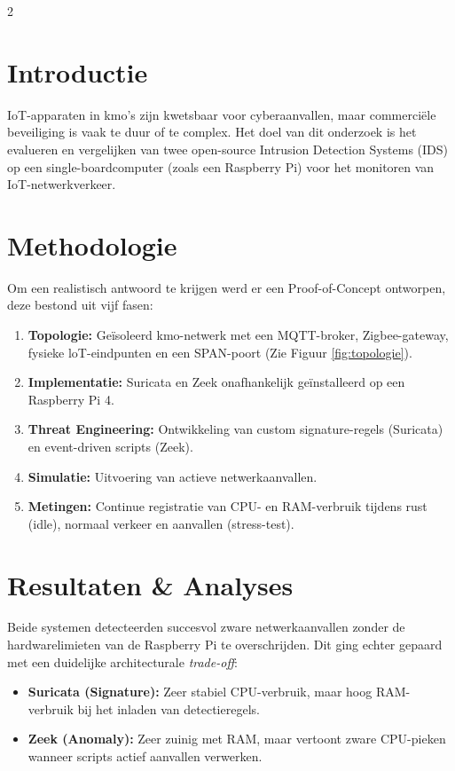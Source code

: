 \documentclass[a0,portrait]{hogent-poster}
\begin{document}
\begin{multicols}{2} %
\raggedbottom
\section{Introductie}
IoT-apparaten in kmo's zijn kwetsbaar voor cyberaanvallen, maar commerciële beveiliging is vaak te duur of te complex. Het doel van dit onderzoek is het evalueren en vergelijken van twee open-source Intrusion Detection Systems (IDS) op een single-boardcomputer (zoals een Raspberry Pi) voor het monitoren van IoT-netwerkverkeer.
\section{Methodologie}
Om een realistisch antwoord te krijgen werd er een Proof-of-Concept ontworpen, deze bestond uit vijf fasen:

\begin{enumerate}
    \setlength\itemsep{20pt}
    \item \textbf{Topologie:} Geïsoleerd kmo-netwerk met een MQTT-broker, Zigbee-gateway, fysieke loT-eindpunten en een SPAN-poort (Zie Figuur \ref{fig:topologie}).
    \item \textbf{Implementatie:} Suricata en Zeek onafhankelijk geïnstalleerd op een Raspberry Pi 4.
    \item \textbf{Threat Engineering:} Ontwikkeling van custom signature-regels (Suricata) en event-driven scripts (Zeek).
    \item \textbf{Simulatie:} Uitvoering van actieve netwerkaanvallen.
    \item \textbf{Metingen:} Continue registratie van CPU- en RAM-verbruik tijdens rust (idle), normaal verkeer en aanvallen (stress-test).
\end{enumerate}


\section{Resultaten \& Analyses}
Beide systemen detecteerden succesvol zware netwerkaanvallen zonder de hardwarelimieten van de Raspberry Pi te overschrijden. Dit ging echter gepaard met een duidelijke architecturale \textit{trade-off}:

\begin{itemize}
    \setlength\itemsep{5pt}
    \item \textbf{Suricata (Signature):} Zeer stabiel CPU-verbruik, maar hoog RAM-verbruik bij het inladen van detectieregels.
    \item \textbf{Zeek (Anomaly):} Zeer zuinig met RAM, maar vertoont zware CPU-pieken wanneer scripts actief aanvallen verwerken.
\end{itemize}


\end{multicols}
\end{document}
